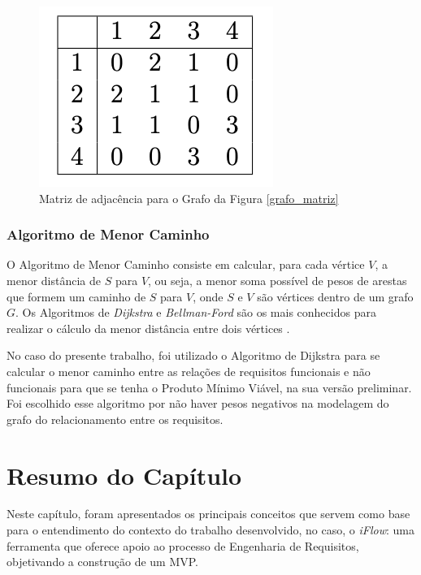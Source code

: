 \begin{figure}[H]
    \begin{center}
        \caption{Matriz de adjacência para o Grafo da Figura \ref{grafo_matriz}}
        \label{matriz_adj}
        \includegraphics[scale=0.7]{figuras/Embasamento/matriz.png}
    \end{center}
\end{figure}


\subsubsection{Algoritmo de Menor Caminho}

\label{sec:ssp}

O Algoritmo de Menor Caminho consiste em calcular, para cada vértice $V$, a menor distância de $S$ para $V$, ou seja, a menor soma possível de pesos de arestas que formem um caminho de $S$ para $V$, onde $S$ e $V$ são vértices dentro de um grafo $G$. Os Algoritmos de \textit{Dijkstra} e \textit{Bellman-Ford} são os mais conhecidos para realizar o cálculo da menor distância entre dois vértices \cite{even2011graph}.

No caso do presente trabalho, foi utilizado o Algoritmo de Dijkstra para se calcular o menor caminho entre as relações de requisitos funcionais e não funcionais para que se tenha o Produto Mínimo Viável, na sua versão preliminar. Foi escolhido esse algoritmo por não haver pesos negativos na modelagem do grafo do relacionamento entre os requisitos.

\section{Resumo do Capítulo}

\label{sec:resumo_embasamento}

Neste capítulo, foram apresentados os principais conceitos que servem como base para o entendimento do contexto do trabalho desenvolvido, no caso, o \textit{iFlow}: uma ferramenta que oferece apoio ao processo de Engenharia de Requisitos, objetivando a construção de um MVP.

